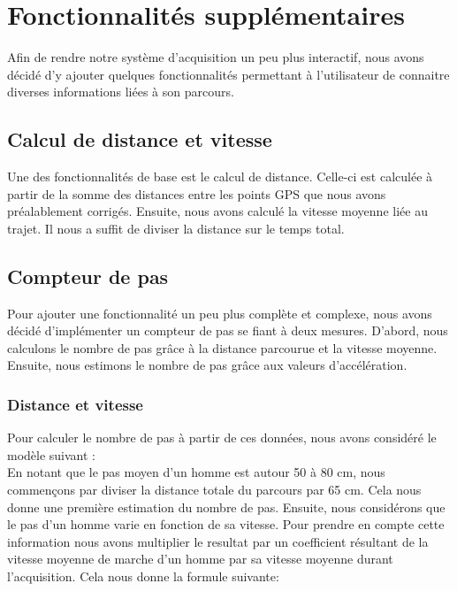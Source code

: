 \chapter{Fonctionnalités supplémentaires}

Afin de rendre notre système d'acquisition un peu plus interactif, nous avons décidé d'y ajouter quelques fonctionnalités permettant à l'utilisateur de connaitre diverses informations liées à son parcours.

\section{Calcul de distance et vitesse}

Une des fonctionnalités de base est le calcul de distance. Celle-ci est calculée à partir de la somme des distances entre les points GPS que nous avons préalablement corrigés. Ensuite, nous avons calculé la vitesse moyenne liée au trajet. Il nous a suffit de diviser la distance sur le temps total.

\section{Compteur de pas}

Pour ajouter une fonctionnalité un peu plus complète et complexe, nous avons décidé d'implémenter un compteur de pas se fiant à deux mesures. D'abord, nous calculons le nombre de pas grâce à la distance parcourue et la vitesse moyenne. Ensuite, nous estimons le nombre de pas grâce aux valeurs d'accélération.

\subsection*{Distance et vitesse}

Pour calculer le nombre de pas à partir de ces données, nous avons considéré le modèle suivant : \\

En notant que le pas moyen d'un homme est autour 50 à 80 cm, nous commençons par diviser la distance totale du parcours par 65 cm. Cela nous donne une première estimation du nombre de pas. Ensuite, nous considérons que le pas d'un homme varie en fonction de sa vitesse. Pour prendre en compte cette information nous avons multiplier le resultat par un coefficient résultant de la vitesse moyenne de marche d'un homme par sa vitesse moyenne durant l'acquisition. Cela nous donne la formule suivante:


